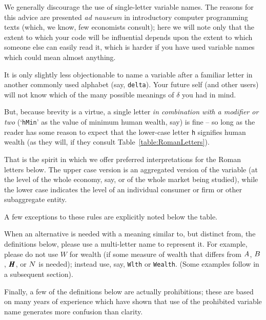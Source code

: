 \documentclass[12pt]{econtex}
\begin{document}
We generally discourage the use of single-letter variable names.  The reasons for this advice are presented {\it ad nauseum} in introductory computer programming texts (which, we know, few economists consult); here we will note only that the extent to which your code will be influential depends upon the extent to which someone else can easily read it, which is harder if you have used variable names which could mean almost anything.

It is only slightly less objectionable to name a variable after a familiar letter in another commonly used alphabet (say, \texttt{delta}).  Your future self (and other users) will not know which of the many possible meanings of $\delta$ you had in mind.

But, because brevity is a virtue, a single letter {\it in combination with a modifier or two} (`\texttt{hMin}' as the value of minimum human wealth, say) is fine -- so long as the reader has some reason to expect that the lower-case letter \texttt{h} signifies human wealth (as they will, if they consult Table~\ref{table:RomanLetters}).

That is the spirit in which we offer preferred interpretations for the Roman letters below.  The upper case version is an aggregated version of the variable (at the level of the whole economy, say, or of the whole market being studied), while the lower case indicates the level of an individual consumer or firm or other subaggregate entity.  

A few exceptions to these rules are explicitly noted below the table.

When an alternative is needed with a meaning similar to, but distinct from, the definitions below, please use a multi-letter name to represent it.  For example, please do not use $W$ for wealth (if some measure of wealth that differs from $A$, $B$, $\pmb{H}$, or $N$ is needed); instead use, say, \texttt{Wlth} or \texttt{Wealth}.  (Some examples follow in a subsequent section).

Finally, a few of the definitions below are actually prohibitions; these are based on many years of experience which have shown that use of the prohibited variable name generates more confusion than clarity.  
\end{document}
